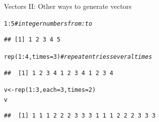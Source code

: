 \documentclass[xcolor=table,       handout,    xcolor=dvipsnames]{beamer}\usepackage[]{graphicx}\usepackage[]{color}
\makeatletter
\newcommand{\hlnum}[1]{\textcolor[rgb]{0,0,0}{#1}}
\newcommand{\hlcom}[1]{\textcolor[rgb]{0,0.392,0}{\textit{#1}}}
\newcommand{\hlopt}[1]{\textcolor[rgb]{0,0,0}{#1}}
\newcommand{\hlstd}[1]{\textcolor[rgb]{0,0,0}{#1}}
\newcommand{\hlkwb}[1]{\textcolor[rgb]{0,0,0}{#1}}
\newcommand{\hlkwc}[1]{\textcolor[rgb]{1,0,1}{#1}}
\newcommand{\hlkwd}[1]{\textcolor[rgb]{0,0,1}{#1}}
\newenvironment{kframe}{%
 \def\at@end@of@kframe{}%
 \ifinner\ifhmode%
  \def\at@end@of@kframe{\end{minipage}}%
  \begin{minipage}{\columnwidth}%
 \fi\fi%
 \def\FrameCommand##1{\hskip\@totalleftmargin \hskip-\fboxsep
 \colorbox{shadecolor}{##1}\hskip-\fboxsep
     \hskip-\linewidth \hskip-\@totalleftmargin \hskip\columnwidth}%
 \MakeFramed {\advance\hsize-\width
   \@totalleftmargin\z@ \linewidth\hsize
   \@setminipage}}%
 {\par\unskip\endMakeFramed%
 \at@end@of@kframe}
\newenvironment{knitrout}{}{} %
\makeatother
\begin{document}
\begin{frame}[fragile]{Vectors II: Other ways to generate vectors}
\pause
\begin{knitrout}
\color{fgcolor}\begin{kframe}
\begin{alltt}
\hlnum{1}\hlopt{:}\hlnum{5}  \hlcom{# integer numbers  from : to}
\end{alltt}
\begin{verbatim}
## [1] 1 2 3 4 5
\end{verbatim}
\end{kframe}
\end{knitrout}
\begin{knitrout}
\color{fgcolor}\begin{kframe}
\begin{alltt}
\hlkwd{rep}\hlstd{(}\hlnum{1}\hlopt{:}\hlnum{4}\hlstd{,} \hlkwc{times}\hlstd{=}\hlnum{3}\hlstd{)} \hlcom{# repeat entries several times}
\end{alltt}
\begin{verbatim}
##  [1] 1 2 3 4 1 2 3 4 1 2 3 4
\end{verbatim}
\end{kframe}
\end{knitrout}
\begin{knitrout}
\color{fgcolor}\begin{kframe}
\begin{alltt}
\hlstd{v} \hlkwb{<-} \hlkwd{rep}\hlstd{(}\hlnum{1}\hlopt{:}\hlnum{3}\hlstd{,} \hlkwc{each}\hlstd{=}\hlnum{3}\hlstd{,} \hlkwc{times}\hlstd{=}\hlnum{2}\hlstd{)}
\hlstd{v}
\end{alltt}
\begin{verbatim}
##  [1] 1 1 1 2 2 2 3 3 3 1 1 1 2 2 2 3 3 3
\end{verbatim}
\end{kframe}
\end{knitrout}
\end{frame}

\end{document}
